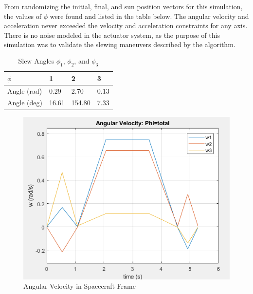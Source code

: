 \documentclass[letterpaper, preprint, paper,11pt]{AAS}	%
\begin{document}
		From randomizing the initial, final, and sun position vectors for this simulation, the values of $\phi$ were found and listed in the table below. The angular velocity and acceleration never exceeded the velocity and acceleration constraints for any axis. There is no noise modeled in the actuator system, as the purpose of this simulation was to validate the slewing maneuvers described by the algorithm. 
		
				\begin{table}[H]
					\centering
					\caption{Slew Angles $\phi_1$, $\phi_2$, and $\phi_3$}
					\begin{tabular}{llll}
						\toprule
						\midrule
						$\phi$ & 1 & 2 & 3 \\
						\midrule
						Angle (rad) & 0.29 & 2.70 & 0.13 \\
						Angle (deg) & 16.61 & 154.80 & 7.33 \\ 
						\midrule
						\bottomrule
					\end{tabular}%
					\label{tab:FOG_SF}%
				\end{table}%
		

			\begin{figure}[H]
				\label{fig:ang_vel_phi_total}
				\begin{center}
				\includegraphics[width=4.5in]{figures/alphaNot0/ang_vel_phi_total.png}
				\end{center}
				\caption{Angular Velocity in Spacecraft Frame}
			\end{figure}
		
\end{document}
